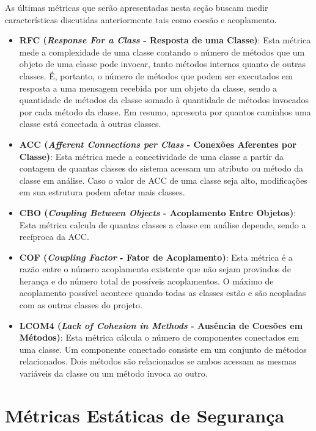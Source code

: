 %

As últimas métricas que serão apresentadas nesta seção buscam medir características discutidas anteriormente tais como coesão e acoplamento.

%

\begin{itemize}
\item \textbf{RFC (\emph{Response For a Class} - Resposta de uma Classe)}: Esta métrica mede a complexidade de uma classe contando o número de métodos que um objeto de uma classe pode invocar, tanto métodos internos quanto de outras classes. É, portanto, o número de métodos que podem ser executados em resposta a uma mensagem recebida por um objeto da classe, sendo a quantidade de métodos da classe somado à quantidade de métodos invocados por cada método da classe. Em resumo, apresenta por quantos caminhos uma classe está conectada à outras classes.
\item \textbf{ACC (\emph{Afferent Connections per Class} - Conexões Aferentes por Classe)}: Esta métrica mede a conectividade de uma classe a partir da contagem de quantas classes do sistema acessam um atributo ou método da classe em análise. Caso o valor de ACC de uma classe seja alto, modificações em sua estrutura podem afetar mais classes.
\item \textbf{CBO (\emph{Coupling Between Objects} - Acoplamento Entre Objetos)}: Esta métrica calcula de quantas classes a classe em análise depende, sendo a recíproca da ACC.
\item \textbf{COF (\emph{Coupling Factor} - Fator de Acoplamento)}: Esta métrica é a razão entre o número acoplamento existente que não sejam provindos de herança e do número total de possíveis acoplamentos. O máximo de acoplamento possível acontece quando todas as classes estão e são acopladas com as outras classes do projeto.
\item \textbf{LCOM4 (\emph{Lack of Cohesion in Methods} - Ausência de Coesões em Métodos)}: Esta métrica cálcula o número de componentes conectados em uma classe. Um componente conectado consiste em um conjunto de métodos relacionados. Dois métodos são relacionados se ambos acessam as mesmas variáveis da classe ou um método invoca ao outro.
\end{itemize}


\section{Métricas Estáticas de Segurança}
\label{subsec-security-metrics}

